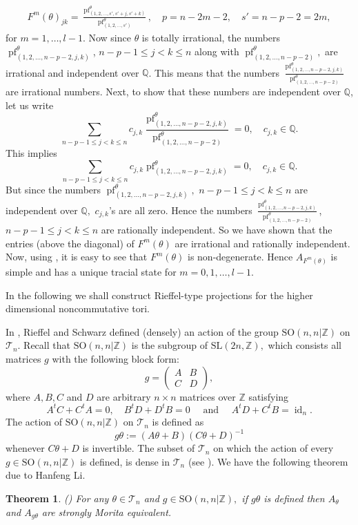 \documentclass[9pt, BCOR=2mm]{amsart}
\numberwithin{equation}{section}
\numberwithin{equation}{section}
\newtheorem{theorem}{Theorem}[section]
\newcommand{\Z}{{\mathbb{Z}}}
\newcommand{\pf}{{\operatorname{pf}}}
\DeclareMathOperator{\id}{id}
\begin{document}
  \begin{eqnarray}\label{g1}
  F^m(\theta)_{jk}=\frac{{\pf}^{\theta}_{(1,2,\dots,s',s'+j,s'+k)}}{{\pf}^{\theta}_{(1,2,\dots,s')}},\quad p=n-2m-2,\quad s'=n-p-2=2m,
  \end{eqnarray}
  for $m=1,\dots,l-1.$
Now since $\theta$ is totally irrational, the numbers ${\pf}^{\theta}_{(1,2,\dots,n-p-2,j,k)}$, $n-p-1\leq j<k\leq n$  along with ${\pf}^{\theta}_{(1,2,\dots,n-p-2)},$ are irrational and independent over $\mathbb{Q}$. This means that the numbers $\frac{{\pf}^{\theta}_{(1,2,\dots,n-p-2,j,k)}}{{\pf}^{\theta}_{(1,2,\dots,n-p-2)}}$ are irrational numbers. Next, to show that these numbers are independent over $\mathbb{Q}$, let us write
$$\sum\limits_{n-p-1\leq j<k\leq n}c_{j,k} \frac{{\pf}^{\theta}_{(1,2,\dots,n-p-2,j,k)}}{{\pf}^{\theta}_{(1,2,\dots,n-p-2)}}=0,\quad c_{j,k}\in \mathbb{Q}.$$
This implies
$$\sum\limits_{n-p-1\leq j<k\leq n}c_{j,k}{\pf}^{\theta}_{(1,2,\dots,n-p-2,j,k)}=0,\quad c_{j,k}\in \mathbb{Q}.$$
But since the numbers ${\pf}^{\theta}_{(1,2,\dots,n-p-2,j,k)},$ $n-p-1\leq j<k\leq n$ are independent over $\mathbb{Q},$ $c_{j,k}$'s are all zero. Hence the numbers $\frac{{\pf}^{\theta}_{(1,2,\dots,n-p-2,j,k)}}{{\pf}^{\theta}_{(1,2,\dots,n-p-2)}}$, $n-p-1\leq j<k\leq n$ are rationally
independent. So we have shown that the entries (above the diagonal) of $F^m(\theta)$ are
irrational and rationally independent. Now, using \cite[Lemma 1.7]{Phi06}, it is easy to see that
$F^m(\theta)$  is non-degenerate. Hence $A_{F^m(\theta)}$ is simple and has a unique tracial state for $m=0,1,\dots,l-1$.






In the following we shall construct Rieffel-type projections for the
higher dimensional noncommutative tori.

 In \cite{RS99}, Rieffel and Schwarz defined (densely) an action of the group $\mathrm{SO}(n, n|\Z)$ on $\mathcal{T}_{n}$. Recall that $\mathrm{SO}(n, n|\Z)$ is the subgroup of $\mathrm{SL}(2n, \Z),$ which consists all matrices $g$ with the following block form: $$
g=\left(\begin{array}{ll}
A & B \\
C & D
\end{array}\right),
$$
where $A, B, C$ and $D$ are arbitrary $n \times n$ matrices over $\Z$ satisfying
$$
A^{t} C+C^{t} A=0, \quad B^{t} D+D^{t} B=0 \quad \text { and } \quad A^{t} D+C^{t} B=\id_n.
$$
The action of $\mathrm{SO}(n, n|\Z)$ on $\mathcal{T}_{n}$ is defined as
$$
g \theta:=(A \theta+B)(C \theta+D)^{-1}
$$
whenever $C \theta+D$ is invertible. The subset of $\mathcal{T}_{n}$ on which the action of every $g \in \mathrm{SO}(n, n|\Z)$ is defined, is dense in $\mathcal{T}_{n}$ (see \cite[page 291]{RS99}). We have the following theorem due to Hanfeng Li. 
\begin{theorem}\label{thm:li_Morita}(\cite[Theorem 1.1]{Li04})
	  For any $\theta \in \mathcal{T}_{n}$ and $g \in \mathrm{SO}(n, n|\Z),$ if $g \theta$ is defined then $A_{\theta}$ and $A_{g \theta}$ are strongly Morita equivalent.
\end{theorem}
\end{document}
